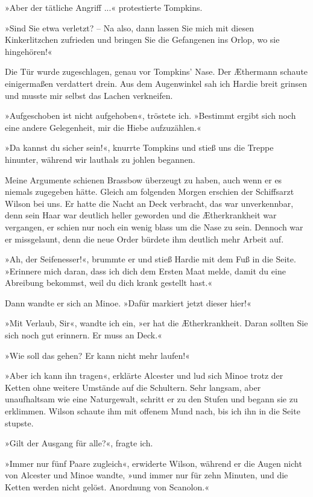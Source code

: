 »Aber der tätliche Angriff ...« protestierte Tompkins.

»Sind Sie etwa verletzt? – Na also, dann lassen Sie mich mit diesen
Kinkerlitzchen zufrieden und bringen Sie die Gefangenen ins Orlop,
wo sie hingehören!«

Die Tür wurde zugeschlagen, genau vor Tompkins’ Nase. Der Æthermann
schaute einigermaßen verdattert drein. Aus dem Augenwinkel sah ich
Hardie breit grinsen und musste mir selbst das Lachen verkneifen.

»Aufgeschoben ist nicht aufgehoben«, tröstete ich. »Bestimmt ergibt
sich noch eine andere Gelegenheit, mir die Hiebe aufzuzählen.«

»Da kannst du sicher sein!«, knurrte Tompkins und stieß uns die
Treppe hinunter, während wir lauthals zu johlen begannen.

Meine Argumente schienen Brassbow überzeugt zu haben, auch wenn er
es niemals zugegeben hätte. Gleich am folgenden Morgen erschien der
Schiffsarzt Wilson bei uns. Er hatte die Nacht an Deck verbracht,
das war unverkennbar, denn sein Haar war deutlich heller geworden
und die Ætherkrankheit war vergangen, er schien nur noch ein wenig
blass um die Nase zu sein. Dennoch war er missgelaunt, denn die
neue Order bürdete ihm deutlich mehr Arbeit auf.

»Ah, der Seifenesser!«, brummte er und stieß Hardie mit dem Fuß in
die Seite. »Erinnere mich daran, dass ich dich dem Ersten Maat
melde, damit du eine Abreibung bekommst, weil du dich krank
gestellt hast.«

Dann wandte er sich an Minoe. »Dafür markiert jetzt dieser hier!«

»Mit Verlaub, Sir«, wandte ich ein, »er hat die Ætherkrankheit.
Daran sollten Sie sich noch gut erinnern. Er muss an Deck.«

»Wie soll das gehen? Er kann nicht mehr laufen!«

»Aber ich kann ihn tragen«, erklärte Alcester und lud sich Minoe
trotz der Ketten ohne weitere Umstände auf die Schultern. Sehr
langsam, aber unaufhaltsam wie eine Naturgewalt, schritt er zu den
Stufen und begann sie zu erklimmen. Wilson schaute ihm mit offenem
Mund nach, bis ich ihn in die Seite stupste.

»Gilt der Ausgang für alle?«, fragte ich.

»Immer nur fünf Paare zugleich«, erwiderte Wilson, während er die
Augen nicht von Alcester und Minoe wandte, »und immer nur für zehn
Minuten, und die Ketten werden nicht gelöst. Anordnung von
Scanolon.«

